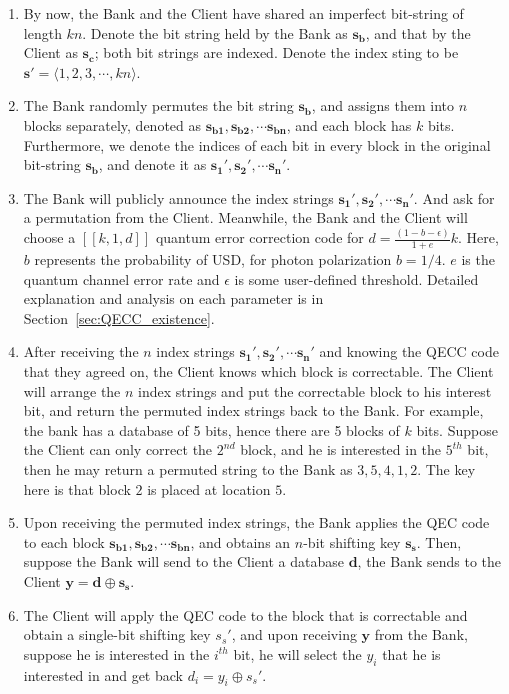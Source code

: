 \documentclass[%
 reprint,
superscriptaddress,
 amsmath,amssymb,
 aps,
]{revtex4-2}
\begin{document}
\begin{enumerate}
    \item By now, the Bank and the Client have shared an imperfect bit-string of length $kn$. Denote the bit string held by the Bank as $\mathbf{s_b}$, and that by the Client as $\mathbf{s_c}$; both bit strings are indexed. Denote the index sting to be $\mathbf{s'}=\langle1, 2, 3, \cdots, kn\rangle$.

    \item The Bank randomly permutes the bit string $\mathbf{s_b}$, and assigns them into $n$ blocks separately, denoted as $\mathbf{s_{b1}}, \mathbf{s_{b2}},\cdots \mathbf{s_{bn}}$, and each block has $k$ bits. Furthermore, we denote the indices of each bit in every block in the original bit-string $\mathbf{s_b}$, and denote it as $\mathbf{s_{1}'}, \mathbf{s_{2}'},\cdots \mathbf{s_{n}'}$.

    \item The Bank will publicly announce the index strings $\mathbf{s_1'}, \mathbf{s_2'},\cdots \mathbf{s_n'}$. And ask for a permutation from the Client. Meanwhile, the Bank and the Client will choose a $[[k, 1, d]]$ quantum error correction code for $d=\frac{(1-b-\epsilon)}{1+e}k$. Here, $b$ represents the probability of USD, for photon polarization $b=1/4$. $e$ is the quantum channel error rate and $\epsilon$ is some user-defined threshold. Detailed explanation and analysis on each parameter is in Section~\ref{sec:QECC_existence}.

    \item After receiving the $n$ index strings $\mathbf{s_1'}, \mathbf{s_2'},\cdots \mathbf{s_n'}$ and knowing the QECC code that they agreed on, the Client knows which block is correctable. The Client will arrange the $n$ index strings and put the correctable block to his interest bit, and return the permuted index strings back to the Bank. For example, the bank has a database of 5 bits, hence there are 5 blocks of $k$ bits. Suppose the Client can only correct the $2^{nd}$ block, and he is interested in the $5^{th}$ bit, then he may return a permuted string to the Bank as $3,5,4, 1, 2$. The key here is that block $2$ is placed at location $5$.

    \item Upon receiving the permuted index strings, the Bank applies the QEC code to each block $\mathbf{s_{b1}}, \mathbf{s_{b2}},\cdots \mathbf{s_{bn}}$, and obtains an $n$-bit shifting key $\mathbf{s_s}$. Then, suppose the Bank will send to the Client a database $\mathbf{d}$, the Bank sends to the Client $\mathbf{y}=\mathbf{d}\oplus\mathbf{s_s}$.

    \item The Client will apply the QEC code to the block that is correctable and obtain a single-bit shifting key $s_s'$, and upon receiving $\mathbf{y}$ from the Bank, suppose he is interested in the $i^{th}$ bit, he will select the $y_i$ that he is interested in and get back $d_i=y_i\oplus s_s'$.
    
\end{enumerate}
\end{document}
